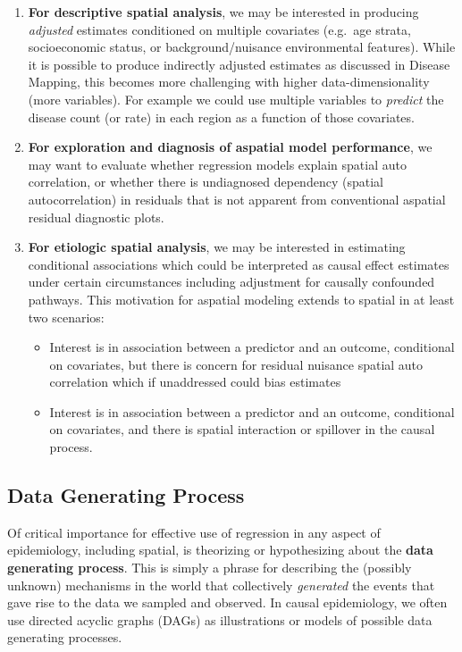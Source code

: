 \documentclass[
]{book}
\providecommand{\tightlist}{%
  \setlength{\itemsep}{0pt}\setlength{\parskip}{0pt}}
\begin{document}
\begin{enumerate}
\def\labelenumi{\arabic{enumi}.}
\tightlist
\item
  \textbf{For descriptive spatial analysis}, we may be interested in producing \emph{adjusted} estimates conditioned on multiple covariates (e.g.~age strata, socioeconomic status, or background/nuisance environmental features). While it is possible to produce indirectly adjusted estimates as discussed in Disease Mapping, this becomes more challenging with higher data-dimensionality (more variables). For example we could use multiple variables to \emph{predict} the disease count (or rate) in each region as a function of those covariates.
\item
  \textbf{For exploration and diagnosis of aspatial model performance}, we may want to evaluate whether regression models explain spatial auto correlation, or whether there is undiagnosed dependency (spatial autocorrelation) in residuals that is not apparent from conventional aspatial residual diagnostic plots.
\item
  \textbf{For etiologic spatial analysis}, we may be interested in estimating conditional associations which could be interpreted as causal effect estimates under certain circumstances including adjustment for causally confounded pathways. This motivation for aspatial modeling extends to spatial in at least two scenarios:

  \begin{itemize}
  \tightlist
  \item
    Interest is in association between a predictor and an outcome, conditional on covariates, but there is concern for residual nuisance spatial auto correlation which if unaddressed could bias estimates
  \item
    Interest is in association between a predictor and an outcome, conditional on covariates, and there is spatial interaction or spillover in the causal process.
  \end{itemize}
\end{enumerate}

\hypertarget{data-generating-process}{%
\subsection{Data Generating Process}\label{data-generating-process}}

Of critical importance for effective use of regression in any aspect of epidemiology, including spatial, is theorizing or hypothesizing about the \textbf{data generating process}. This is simply a phrase for describing the (possibly unknown) mechanisms in the world that collectively \emph{generated} the events that gave rise to the data we sampled and observed. In causal epidemiology, we often use directed acyclic graphs (DAGs) as illustrations or models of possible data generating processes.
\end{document}
